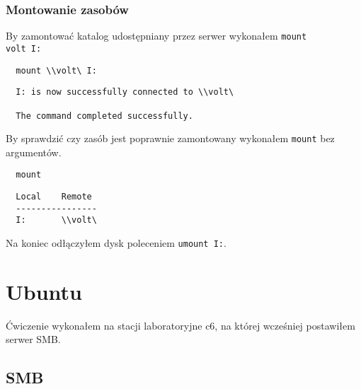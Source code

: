 \documentclass{article} %
\begin{document}
\subsubsection{Montowanie zasobów}
By zamontować katalog udostępniany przez serwer wykonałem \texttt{mount \\volt\ I:}
\begin{tcolorbox}[colback=yellow!10!white,colframe=red!45!black,coltitle=yellow!100!black, title=Windows]
  \begin{lstlisting}
  mount \\volt\ I:
  \end{lstlisting}
  \tcblower
  \footnotesize
  \begin{lstlisting}
  I: is now successfully connected to \\volt\

  The command completed successfully.
  \end{lstlisting}
\end{tcolorbox}
\normalsize
\vspace{5mm}

By sprawdzić czy zasób jest poprawnie zamontowany wykonałem \texttt{mount} bez argumentów.
\begin{tcolorbox}[colback=yellow!10!white,colframe=red!45!black,coltitle=yellow!100!black, title=Windows]
  \begin{lstlisting}
  mount
  \end{lstlisting}
  \tcblower
  \footnotesize
  \begin{lstlisting}
  Local    Remote
  ----------------
  I:       \\volt\
  \end{lstlisting}
\end{tcolorbox}
\normalsize
\vspace{5mm}

Na koniec odłączyłem dysk poleceniem \texttt{umount I:}.

\section{Ubuntu}
Ćwiczenie wykonałem na stacji laboratoryjne c6, na której wcześniej postawiłem serwer SMB.

\subsection{SMB}
\end{document}
